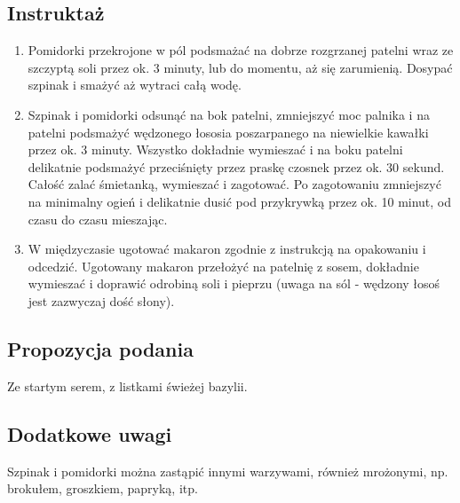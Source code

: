 \subsection*{Instruktaż}
\begin{enumerate}
    \item Pomidorki przekrojone w pól podsmażać na dobrze rozgrzanej patelni wraz ze szczyptą soli przez ok. 3 minuty, lub do momentu, aż się zarumienią. Dosypać szpinak i smażyć aż wytraci całą wodę.
    \item Szpinak i pomidorki odsunąć na bok patelni, zmniejszyć moc palnika i na patelni podsmażyć wędzonego łososia poszarpanego na niewielkie kawałki przez ok. 3 minuty. Wszystko dokładnie wymieszać i na boku patelni delikatnie podsmażyć przeciśnięty przez praskę czosnek przez ok. 30 sekund. Całość zalać śmietanką, wymieszać i zagotować. Po zagotowaniu zmniejszyć na minimalny ogień i delikatnie dusić pod przykrywką przez ok. 10 minut, od czasu do czasu mieszając.
    \item W międzyczasie ugotować makaron zgodnie z instrukcją na opakowaniu i odcedzić. Ugotowany makaron przełożyć na patelnię z sosem, dokładnie wymieszać i doprawić odrobiną soli i pieprzu (uwaga na sól - wędzony łosoś jest zazwyczaj dość słony).
\end{enumerate}

\vspace{0.5cm}

\small
\subsection*{Propozycja podania} Ze startym serem, z listkami świeżej bazylii.

\vspace{0.3cm}

\subsection*{Dodatkowe uwagi} Szpinak i pomidorki można zastąpić innymi warzywami, również mrożonymi, np. brokułem, groszkiem, papryką, itp.

\newpage
